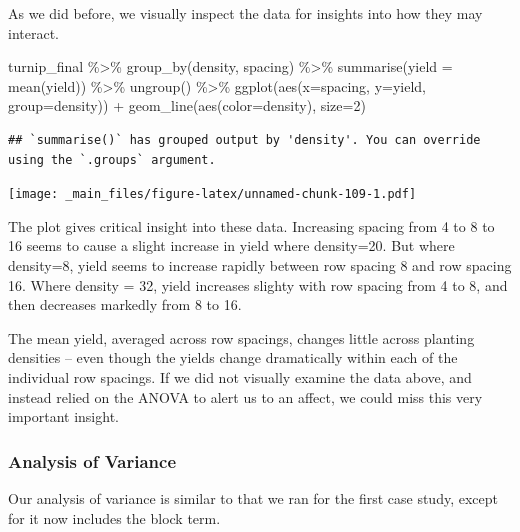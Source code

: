 \documentclass[
]{book}
\newenvironment{Shaded}{\begin{snugshade}}{\end{snugshade}}
\newcommand{\AttributeTok}[1]{\textcolor[rgb]{0.77,0.63,0.00}{#1}}
\newcommand{\DecValTok}[1]{\textcolor[rgb]{0.00,0.00,0.81}{#1}}
\newcommand{\FunctionTok}[1]{\textcolor[rgb]{0.00,0.00,0.00}{#1}}
\newcommand{\NormalTok}[1]{#1}
\newcommand{\SpecialCharTok}[1]{\textcolor[rgb]{0.00,0.00,0.00}{#1}}
\begin{document}
As we did before, we visually inspect the data for insights into how they may interact.

\begin{Shaded}
\begin{Highlighting}[]
\NormalTok{turnip\_final }\SpecialCharTok{\%\textgreater{}\%}
  \FunctionTok{group\_by}\NormalTok{(density, spacing) }\SpecialCharTok{\%\textgreater{}\%}
  \FunctionTok{summarise}\NormalTok{(}\AttributeTok{yield =} \FunctionTok{mean}\NormalTok{(yield)) }\SpecialCharTok{\%\textgreater{}\%}
  \FunctionTok{ungroup}\NormalTok{() }\SpecialCharTok{\%\textgreater{}\%}
  \FunctionTok{ggplot}\NormalTok{(}\FunctionTok{aes}\NormalTok{(}\AttributeTok{x=}\NormalTok{spacing, }\AttributeTok{y=}\NormalTok{yield, }\AttributeTok{group=}\NormalTok{density)) }\SpecialCharTok{+}
  \FunctionTok{geom\_line}\NormalTok{(}\FunctionTok{aes}\NormalTok{(}\AttributeTok{color=}\NormalTok{density), }\AttributeTok{size=}\DecValTok{2}\NormalTok{) }
\end{Highlighting}
\end{Shaded}

\begin{verbatim}
## `summarise()` has grouped output by 'density'. You can override using the `.groups` argument.
\end{verbatim}

\texttt{[image: \_main\_files/figure-latex/unnamed-chunk-109-1.pdf]}

The plot gives critical insight into these data. Increasing spacing from 4 to 8 to 16 seems to cause a slight increase in yield where density=20. But where density=8, yield seems to increase rapidly between row spacing 8 and row spacing 16. Where density = 32, yield increases slighty with row spacing from 4 to 8, and then decreases markedly from 8 to 16.

The mean yield, averaged across row spacings, changes little across planting densities -- even though the yields change dramatically within each of the individual row spacings. If we did not visually examine the data above, and instead relied on the ANOVA to alert us to an affect, we could miss this very important insight.

\hypertarget{analysis-of-variance-3}{%
\subsubsection{Analysis of Variance}\label{analysis-of-variance-3}}

Our analysis of variance is similar to that we ran for the first case study, except for it now includes the block term.
\end{document}
